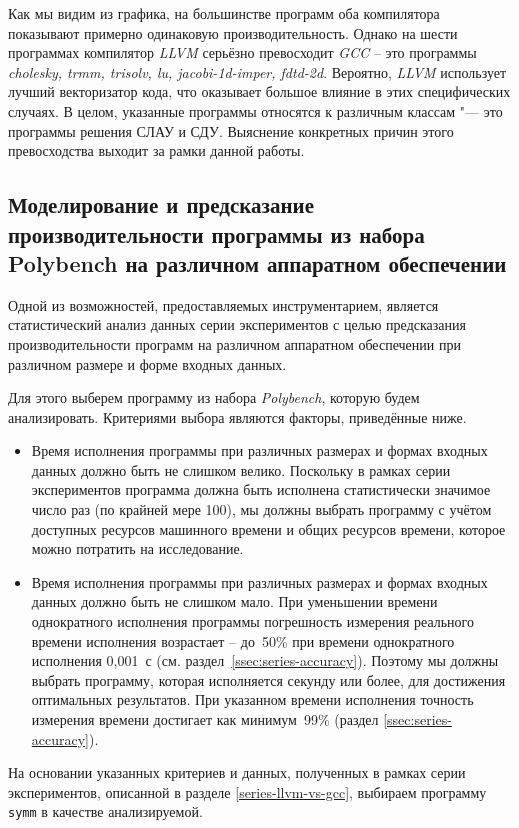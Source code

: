 Как мы видим из графика, на большинстве программ оба компилятора показывают примерно одинаковую производительность. Однако на шести программах компилятор \textit{LLVM} серьёзно превосходит \textit{GCC} -- это программы \textit{cholesky, trmm, trisolv, lu, jacobi-1d-imper, fdtd-2d}. Вероятно, \textit{LLVM} использует лучший векторизатор кода, что оказывает большое влияние в этих специфических случаях. В целом, указанные программы относятся к различным классам "--- это программы решения СЛАУ и СДУ. Выяснение конкретных причин этого превосходства выходит за рамки данной работы.

\subsection{Моделирование и предсказание производительности программы из набора Polybench на различном аппаратном обеспечении}

Одной из возможностей, предоставляемых инструментарием, является статистический анализ данных серии экспериментов с целью предсказания производительности программ на различном аппаратном обеспечении при различном размере и форме входных данных.

Для этого выберем программу из набора \textit{Polybench}, которую будем анализировать. Критериями выбора являются факторы, приведённые ниже.
\begin{itemize}
    \item Время исполнения программы при различных размерах и формах входных данных должно быть не слишком велико. Поскольку в рамках серии экспериментов программа должна быть исполнена статистически значимое число раз (по крайней мере 100), мы должны выбрать программу с учётом доступных ресурсов машинного времени и общих ресурсов времени, которое можно потратить на исследование.
    \item Время исполнения программы при различных размерах и формах входных данных должно быть не слишком мало. При уменьшении времени однократного исполнения программы погрешность измерения реального времени исполнения возрастает -- до~50\% при времени однократного исполнения 0,001~с (см. раздел~\ref{ssec:series-accuracy}). Поэтому мы должны выбрать программу, которая исполняется секунду или более, для достижения оптимальных результатов. При указанном времени исполнения точность измерения времени достигает как минимум~99\% (раздел \ref{ssec:series-accuracy}).
\end{itemize}

На основании указанных критериев и данных, полученных в рамках серии экспериментов, описанной в разделе \ref{series-llvm-vs-gcc}, выбираем программу \texttt{symm} в качестве анализируемой.

